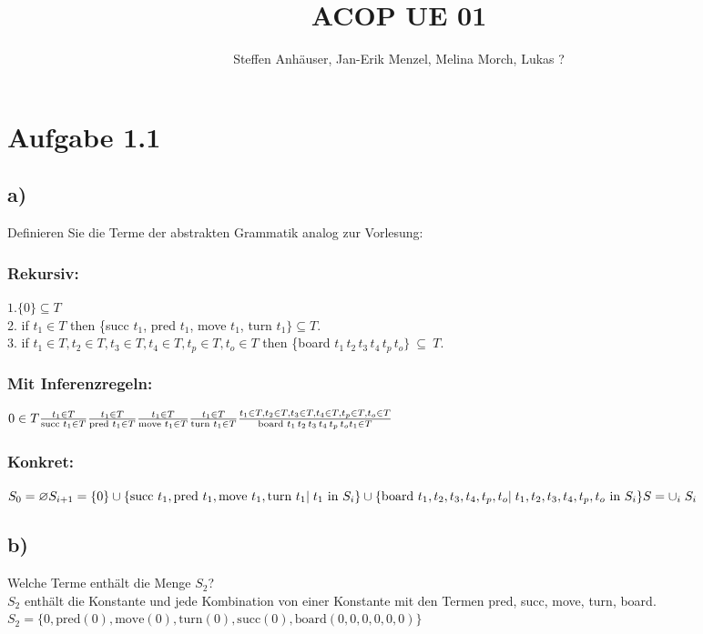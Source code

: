 \documentclass[12pt,a4paper]{article}
\author{Steffen Anhäuser, Jan-Erik Menzel, Melina Morch, Lukas ?}
\title{ACOP UE 01}
\date{}
\begin{document}
\maketitle

\section*{Aufgabe 1.1}

\subsection*{a)}
Definieren Sie die Terme der abstrakten Grammatik analog zur Vorlesung:
\subsubsection*{Rekursiv:}
$ 1. \{0\} \subseteq T $
\\
2. if $t_1 \in T$ 
then 
\{succ  $t_1$, pred  $t_1$, move $t_1$, turn $t_1\} \subseteq T$.
\\
3. if $t_1 \in T, t_2 \in T, t_3 \in T, t_4 \in T, t_p \in T, t_o \in T$ then \{board $t_1 \, t_2 \, t_3 \, t_4 \, t_p \, t_o \}~\subseteq~T$.
\\
\subsubsection*{Mit Inferenzregeln:}
$ 0 \in T  
\\
\frac{t_1 \in T}{\text{succ }t_1 \in T} \frac{t_1 \in T}{\text{pred }t_1 \in T} \frac{t_1 \in T}{\text{move }t_1 \in T} \frac{t_1 \in T}{\text{turn }t_1 \in T}
\\
\frac{t_1 \in T, t_2 \in T, t_3 \in T, t_4 \in T, t_p \in T, t_o \in T}{\text{board }t_1 \, t_2 \, t_3 \, t_4 \, t_p \, t_o t_1 \in T}
$ 
\\
\subsubsection*{Konkret:}
$S_0 = \varnothing  
\\
S_{i+1} = \{0\} \cup \{ \text{succ } t_1, \text{pred } t_1, \text{move } t_1, \text{turn } t_1 |  \;t_1 \ \text{in } S_i\} 
\\ \cup \{\text{board } t_1, t_2, t_3, t_4, t_p, t_o | \; t_1, t_2, t_3, t_4, t_p, t_o \text{ in } S_i\}
\\
S = \cup_i \; S_i$

\subsection*{b)}
Welche Terme enthält die Menge $S_2$?
\\
$S_2$ enthält die Konstante und jede Kombination von einer Konstante mit den Termen pred, succ, move, turn, board.
\\
$ S_2 = \{0,\text{pred}(0), \text{move}(0), \text{turn}(0), \text{succ}(0),\text{board}(0,0,0,0,0,0)\}$
\end{document}
